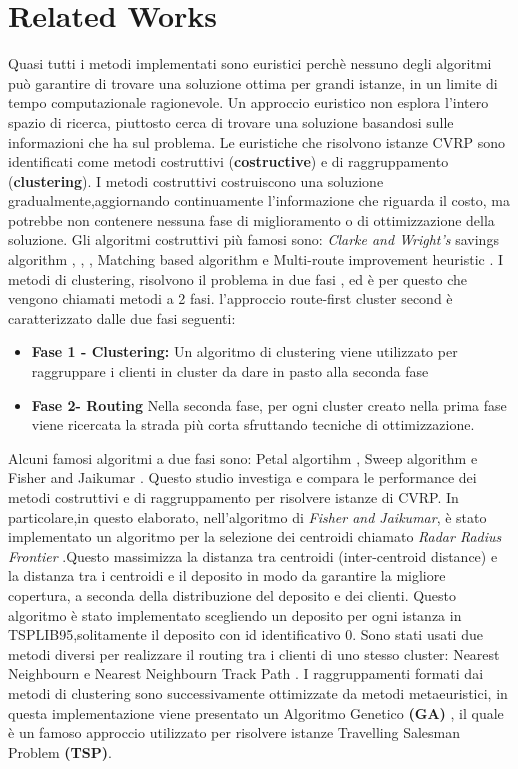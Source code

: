 \documentclass[]{article}
\begin{document}
\section{Related Works}
Quasi tutti i metodi implementati sono euristici perchè nessuno degli algoritmi può garantire di trovare una soluzione ottima per grandi istanze, in un limite di tempo computazionale ragionevole.
Un approccio euristico non esplora l'intero spazio di ricerca, piuttosto cerca di trovare una soluzione basandosi sulle informazioni che ha sul problema.
Le euristiche che risolvono istanze CVRP sono identificati come metodi costruttivi (\textbf{costructive}) e di raggruppamento (\textbf{clustering}).
I metodi costruttivi costruiscono una soluzione gradualmente,aggiornando continuamente l'informazione che riguarda il costo, ma potrebbe non contenere nessuna fase di miglioramento o di ottimizzazione della soluzione.
Gli algoritmi costruttivi più famosi sono: \textit{Clarke and Wright's} savings algorithm \cite{CK1}, \cite{CK2} , \cite{CK3} , Matching based algorithm e Multi-route improvement heuristic \cite{CK3}.
I metodi di clustering, risolvono il problema in due fasi , ed è per questo che vengono chiamati metodi a 2 fasi.  l'approccio route-first cluster second è caratterizzato dalle due fasi seguenti:
\begin{itemize}
\item \textbf{Fase 1 - Clustering:} Un algoritmo di clustering viene utilizzato per raggruppare i clienti in cluster da dare in pasto alla seconda fase
\item \textbf{Fase 2- Routing} Nella seconda fase, per ogni cluster creato nella prima fase viene ricercata la strada più corta sfruttando tecniche di ottimizzazione.
\end{itemize}
Alcuni famosi algoritmi a due fasi sono: Petal algortihm \cite{petal}, Sweep algorithm \cite{sweep} e Fisher and Jaikumar \cite{FJ}.
Questo studio investiga e compara le performance dei metodi costruttivi e di raggruppamento per risolvere istanze di CVRP.
In particolare,in questo elaborato, nell'algoritmo di \textit{Fisher and Jaikumar}, è stato implementato un algoritmo per la selezione dei centroidi chiamato \textit{Radar Radius Frontier} .Questo  massimizza la distanza tra centroidi (inter-centroid distance) e la distanza tra i centroidi e il deposito in modo da garantire la migliore copertura, a seconda della distribuzione del deposito e dei clienti.
Questo algoritmo è stato implementato scegliendo un deposito per ogni istanza in TSPLIB95,solitamente il deposito con id identificativo 0.
Sono stati usati due metodi diversi per realizzare il routing tra i clienti di uno stesso cluster: Nearest Neighbourn e Nearest Neighbourn Track Path .
I raggruppamenti formati dai metodi di clustering sono successivamente ottimizzate da metodi metaeuristici, in questa implementazione viene presentato un Algoritmo Genetico  \textbf{(GA)} \cite{GA}, il quale è un famoso approccio utilizzato per risolvere istanze Travelling Salesman Problem \textbf{(TSP)}.
\end{document}
